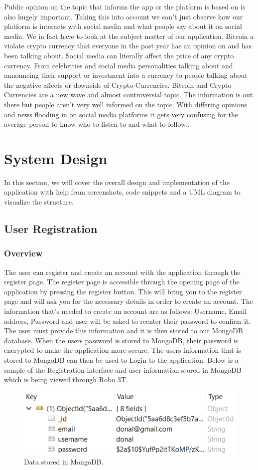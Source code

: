 Public opinion on the topic that informs the app or the platform is based on is also hugely important. Taking this into account we can't just observe how our platform is interacts with social media and what people say about it on social media. We in fact have to look at the subject matter of our application, Bitcoin a violate crypto currency that everyone in the past year has an opinion on and has been talking about. Social media can literally affect the price of any crypto currency. From celebrities and social media personalities talking about and announcing their support or investment into a currency to people talking about the negative affects or downside of Crypto-Currencies. Bitcoin and Crypto-Currencies are a new wave and almost controversial topic. The information is out there but people aren't very well informed on the topic. With differing opinions and news flooding in on social media platforms it gets very confusing for the average person to know who to listen to and what to follow..


\chapter{System Design}
In this section, we will cover the overall design and implementation of the application with help from screenshots, code snippets and a UML diagram to visualize the structure.

\section{User Registration}

\subsection{Overview}
The user can register and create an account with the application through the register page. The register page is accessible through the opening page of the application by pressing the register button. This will bring you to the register page and will ask you for the necessary details in order to create an account. The information that's needed to create an account are as follows:
Username, Email address, Password and user will be asked to reenter their password to confirm it. The user must provide this information and it is then stored to our MongoDB database. When the users password is stored to MongoDB, their password is encrypted to make the application more secure. The users information that is stored to MongoDB can then be used to Login to the application. Below is a sample of the Registration interface and user information stored in MongoDB which is being viewed through Robo 3T.
\begin{figure}[H]
\centering
\includegraphics[]{img/UserInfo.png}
\caption{Data stored in MongoDB.}
\end{figure}


